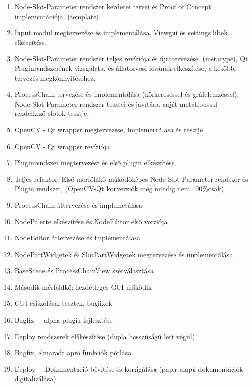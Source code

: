 \documentclass[a4paper,12pt,oneside]{report}
\begin{document}
\begin{enumerate}
\itemsep0em
\item Node-Slot-Parameter rendszer kezdetei tervei és Proof of Concept implementációja. (template)
\item Input modul megtervezése és implementálása, Viewgui és settings libek elkészítése.
\item Node-Slot-Parameter rendszer teljes revíziója és újratervezése. (metatype), Qt Pluginrendszerének vizsgálata, és állatorvosi lovának elkészítése, a későbbi tervezés megkönnyítéséhez.
\item ProcessChain tervezése és implementálása (körkereséssel és gráfelemzéssel), Node-Slot-Parameter rendszer tesztei és javítása, saját metatípussal rendelkező slotok tesztje.
\item OpenCV - Qt wrapper megtervezése, implementálása és tesztje
\item OpenCV - Qt wrapper revíziója
\item Pluginrendszer megtervezése és első plugin elkészítése
\item Teljes refaktor: Első mérföldkő működőképes Node-Slot-Parameter rendszer és Plugin rendszer, (OpenCV-Qt konverziók még mindig nem 100\%osak)
\item ProcessChain áttervezése és implemetálása
\item NodePalette elkészítése és NodeEditor első verziója
\item NodeEditor áttervezése és implementálása
\item NodePartWidgetek és SlotPartWidgetek megtervezése és implementálása
\item BaseScene és ProcessChainView szétválasztása
\item Második mérföldkő: kezdetleges GUI működik
\item GUI csiszolása, tesztek, bugfixek
\item Bugfix + alpha plugin fejlesztése
\item Deploy rendszerek előkészítése (dupla hosszúságú lett végül)
\item Bugfix, elmaradt apró funkciók pótlása
\item Deploy + Dokumentáció bővítése és korrigálása (papír alapú dokumentációk digitalizálása)

\end{enumerate}
\end{document}
